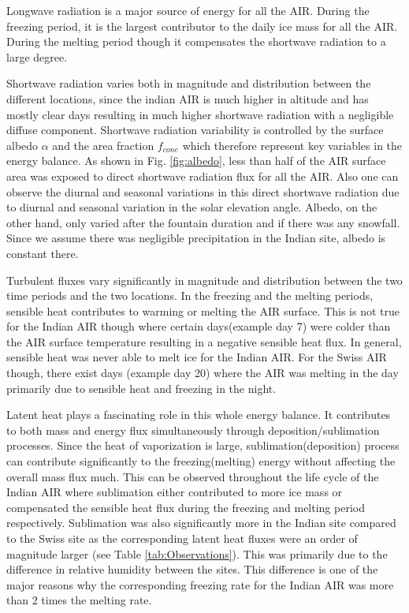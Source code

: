 \documentclass[utf8]{frontiersSCNS} %
\begin{document}
Longwave radiation is a major source of energy for all the AIR. During the freezing period, it is the largest
contributor to the daily ice mass for all the AIR. During the melting period though it compensates the shortwave
radiation to a large degree.

Shortwave radiation varies both in magnitude and distribution between the different locations, since the indian AIR is
much higher in altitude and has mostly clear days resulting in much higher shortwave radiation with a negligible
diffuse component.  Shortwave radiation variability is controlled by the surface albedo $\alpha$ and the area
fraction $f_{cone}$ which therefore represent key variables in the energy balance. As shown in Fig. \ref{fig:albedo},
less than half of the AIR surface area was exposed to direct shortwave radiation flux for all the AIR. Also one can
observe the diurnal and seasonal variations in this direct shortwave radiation due to diurnal and seasonal variation in
the solar elevation angle.  Albedo, on the other hand, only varied after the fountain duration and if there was any
snowfall. Since we assume there was negligible precipitation in the Indian site, albedo is constant there.

Turbulent fluxes vary significantly in magnitude and distribution between the two time periods and the two locations.
In the freezing and the melting periods, sensible heat contributes to warming or melting the AIR surface. This is not
true for the Indian AIR though where certain days(example day 7) were colder than the AIR surface temperature resulting
in a negative sensible heat flux. In general, sensible heat was never able to melt ice for the Indian AIR. For the Swiss
AIR though, there exist days (example day 20) where the AIR was melting in the day primarily due to sensible heat and
freezing in the night.

Latent heat plays a fascinating role in this whole energy balance. It contributes to both mass and energy flux
simultaneously through deposition/sublimation processes. Since the heat of vaporization is large,
sublimation(deposition) process can contribute significantly to the freezing(melting) energy without affecting the
overall mass flux much. This can be observed throughout the life cycle of the Indian AIR where sublimation either
contributed to more ice mass or compensated the sensible heat flux during the freezing and melting period respectively.
Sublimation was also significantly more in the Indian site compared to the Swiss site as the corresponding latent heat
fluxes were an order of magnitude larger (see Table \ref{tab:Observations}). This was primarily due to the difference in
relative humidity between the sites. This difference is one of the major reasons why the corresponding freezing rate
for the Indian AIR was more than 2 times the melting rate.
\end{document}
